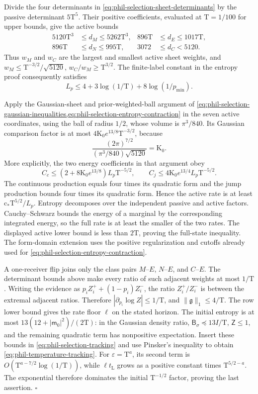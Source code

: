 Divide the four determinants in
\cref{eq:phil-selection-sheet-determinants} by the passive determinant
\(5\mathrm T^5\). Their positive coefficients, evaluated at
\(\mathrm T=1/100\) for upper bounds, give the active bounds
\[
 \begin{aligned}
 5120\mathrm T^3&\le d_M\le5262\mathrm T^3,&
 896\mathrm T&\le d_E\le1017\mathrm T,\\
 896\mathrm T&\le d_N\le995\mathrm T,&
 3072&\le d_C<5120.
 \end{aligned}
\]
Thus \(w_M\) and \(w_C\) are the largest and smallest active sheet
weights, and \(w_M\le\mathrm T^{-3/2}/\sqrt{5120}\),
\(w_C/w_M\ge\mathrm T^{3/2}\). The finite-label constant in the
entropy proof consequently satisfies
\[
 L_p\le4+3\log(1/\mathrm T)+8\log(1/p_{\min}).
\]

Apply the Gaussian-sheet and prior-weighted-ball argument of
\cref{eq:phil-selection-gaussian-inequalities,eq:phil-selection-entropy-contraction}
in the seven active coordinates, using the ball of radius \(1/2\), whose
volume is \(\pi^3/840\). Its Gaussian comparison factor is at most
\(4\mathrm K_0e^{13/8}\mathrm T^{-3/2}\), because
\[
 \frac{(2\pi)^{7/2}}{(\pi^3/840)\sqrt{5120}}=\mathrm K_0.
\]
More explicitly, the two energy coefficients in that argument obey
\[
 C_c\le(2+8\mathrm K_0e^{13/8})L_p\mathrm T^{-5/2},\qquad
 C_j\le4\mathrm K_0e^{13/4}L_p\mathrm T^{-5/2}.
\]
The continuous production equals four times its quadratic form and the
jump production bounds four times its quadratic form. Hence the active
rate is at least \(\mathrm c_*\mathrm T^{5/2}/L_p\). Entropy decomposes
over the independent passive and active factors. Cauchy--Schwarz bounds
the energy of a marginal by the corresponding integrated energy, so the
full rate is at least the smaller of the two rates. The displayed active
lower bound is less than \(2\mathrm T\), proving the full-state inequality.
The form-domain extension uses the positive regularization and cutoffs
already used for \cref{eq:phil-selection-entropy-contraction}.

A one-receiver flip joins only the class pairs \(M\)--\(E\),
\(N\)--\(E\), and \(C\)--\(E\). The determinant bounds above make every
ratio of such adjacent weights at most \(1/\mathrm T\).
Writing the evidence as \(p_iZ_i^++(1-p_i)Z_i^-\), the ratio
\(Z_i^+/Z_i^-\) is between the extremal adjacent ratios. Therefore
\(|\partial_{p_i}\log Z|\le1/\mathrm T\), and
\(\|\mathfrak g\|_1\le4/\mathrm T\).
The row lower bound gives the rate floor \(\ell\) on the stated horizon.
The initial entropy is at most
\(13(12+|\mathsf m_0|^2)/(2\mathrm T)\): in the Gaussian density ratio,
\(\mathsf B_\sigma\preceq13I/\mathrm T\),
\(\mathsf Z\le1\), and the remaining quadratic term has nonpositive
expectation. Insert these bounds in
\cref{eq:phil-selection-tracking} and use Pinsker's inequality to obtain
\cref{eq:phil-temperature-tracking}.
For \(\varepsilon=\mathrm T^a\), its second term is
\(O(\mathrm T^{a-7/2}\log(1/\mathrm T))\), while
\(\ell t_{\mathrm L}\) grows as a positive constant times
\(\mathrm T^{5/2-a}\). The exponential therefore dominates the initial
\(\mathrm T^{-1/2}\) factor, proving the last assertion. \(\square\)